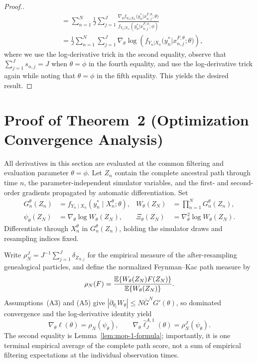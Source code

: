 \documentclass[11pt]{article}
\newcommand\thmMopConvergence{2}
\newcommand\refAssumpBoundedMeasurement{(A3)} %
\newcommand\refAssumpDifferentiableSimulator{(A5)} %
\theoremstyle{thmstylethree}%
\begin{document}
\begin{proof}[Proof.]
\begin{align}
    &= \sum_{n=1}^N \frac{1}{J} \sum_{j=1}^J \frac{\nabla_\theta f_{Y_n|X_{n}}\big(y_n^*|x_{n,j}^{F, \theta}; \theta\big)}{f_{Y_n|X_{n}}(y_n^*|x_{n,j}^{F, \phi}; \phi)} \\
    &= \frac{1}{J} \sum_{n=1}^N \sum_{j=1}^J \nabla_\theta \log\left(f_{Y_n|X_{n}}\big(y_n^*|x_{n,j}^{F, \theta}; \theta\big)\right),
\end{align}
where we use the log-derivative trick in the second equality, observe that $\sum_{j=1}^J s_{n,j} = J$ when $\theta=\phi$ in the fourth equality, and use the log-derivative trick again while noting that $\theta=\phi$ in the fifth equality. This yields the desired result.
\end{proof}



\section{Proof of Theorem~{\thmMopConvergence} (Optimization Convergence Analysis)}
\label{appendix:convergence}

All derivatives in this section are evaluated at the common filtering and
evaluation parameter $\theta=\phi$.  Let $Z_n$ contain the complete ancestral
path through time $n$, the parameter-independent simulator variables, and the
first- and second-order gradients propagated by automatic differentiation.  Set
\begin{align}
G_n^\theta(Z_n)
  &=f_{Y_n\mid X_n}(y_n^*\mid X_n^\theta;\theta),
&W_\theta(Z_N)&=\prod_{n=1}^N G_n^\theta(Z_n),                 \label{eq:s2-weight}\\
\psi_\theta(Z_N)
  &=\nabla_\theta\log W_\theta(Z_N),
&\Xi_\theta(Z_N)&=\nabla_\theta^2
                         \log W_\theta(Z_N).                  \label{eq:s2-score-curvature}
\end{align}
Differentiate through $X_n^\theta$ in $G_n^\theta(Z_n)$, holding the
simulator draws and resampling indices fixed.

Write $\rho_N^J=J^{-1}\sum_{j=1}^J\delta_{Z_{N,j}}$ for the empirical measure
of the after-resampling genealogical particles, and define the normalized
Feynman--Kac path measure by
\begin{equation}
\rho_N(F)=\frac{\mathbb{E}\{W_\theta(Z_N)F(Z_N)\}}
                 {\mathbb{E}\{W_\theta(Z_N)\}}.
\label{eq:s2-rho-definition}
\end{equation}
Assumptions~{\refAssumpBoundedMeasurement} and
{\refAssumpDifferentiableSimulator} give
$|\partial_{\theta_i}W_\theta|\leq N\bar G^NG'(\theta)$, so dominated
convergence and the log-derivative identity yield
\begin{equation}
\nabla_\theta\ell(\theta)=\rho_N(\psi_\theta),
\qquad
\nabla_\theta\hat\ell_J^{A,1}(\theta)=\rho_N^J(\psi_\theta).
\label{eq:s2-gradient-identities}
\end{equation}
The second equality is Lemma~\ref{lem:mop-1-formula}; importantly, it is one
terminal empirical average of the complete path score, not a sum of empirical
filtering expectations at the individual observation times.
\end{document}
